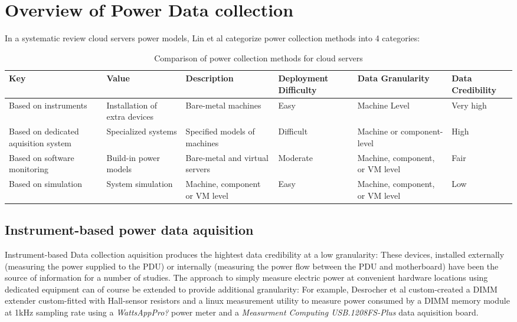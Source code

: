 \section{Overview of Power Data collection}

In a systematic review cloud servers power models, Lin et al\parencite{lin2020taxonomy} categorize power collection methods into 4 categories:
\begin{table}[h]
    \tiny
    \caption{Comparison of power collection methods for cloud servers}
    \label{tab:power_collection_methods}
    \begin{tabular}{p{2cm} p{2cm} p{2.5cm} p{1.2cm} p{2cm} p{1.5cm}}
        \toprule
        \textbf{Key} & \textbf{Value} & \textbf{Description} & \textbf{Deployment Difficulty} & \textbf{Data Granularity} & \textbf{Data Credibility}\\\midrule
        Based on instruments & Installation of extra devices & Bare-metal machines & Easy & Machine Level & Very high \\
        \hline
        Based on dedicated aquisition system & Specialized systems & Specified models of machines & Difficult & Machine or component-level & High \\
        \hline
        Based on software monitoring & Build-in power models & Bare-metal and virtual servers & Moderate & Machine, component, or VM level & Fair \\
        \hline
        Based on simulation & System simulation & Machine, component or VM level & Easy & Machine, component, or VM level & Low\\
        \bottomrule
    \end{tabular}
\end{table}

\subsection{Instrument-based power data aquisition}

Instrument-based Data collection aquisition produces the hightest data credibility at a low granularity: These devices, installed externally (measuring the power supplied to the PDU) or internally (measuring the power flow between the PDU and motherboard) have been  the source of information for a number of studies. The approach to simply measure electric power at convenient hardware locations using dedicated equipment can of course be extended to provide additional granularity: For example, Desrocher et al\parencite{desrochers2016validation} custom-created a DIMM extender custom-fitted with Hall-sensor resistors and a linux measurement utility to measure power consumed by a DIMM memory module at 1kHz sampling rate using a \textit{WattsAppPro?} power meter and a \textit{Measurment Computing USB.1208FS-Plus} data aquisition board.

